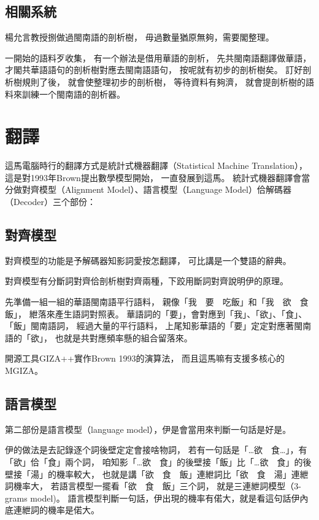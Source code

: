 \subsection{相關系統}
\label{小節：剖析相關系統}
楊允言教授捌做過閩南語的剖析樹\cite{台語文語法結構樹建置}，
毋過數量猶原無夠，需要閣整理。

一開始的語料歹收集，
有一个辦法是借用華語的剖析，
先共閩南語翻譯做華語，
才閣共華語語句的剖析樹\cite{chen2005chinese}對應去閩南語語句，
按呢就有初步的剖析樹矣。
訂好剖析樹規則了後，
就會使整理初步的剖析樹，
等待資料有夠濟，
就會提剖析樹的語料來訓練一个閩南語的剖析器\cite{klein2003accurate}。

\section{翻譯}
\label{節：翻譯}
這馬電腦時行的翻譯方式是統計式機器翻譯（Statistical Machine Translation），
這是對1993年Brown提出數學模型\cite{brown1993mathematics}開始，
一直發展到這馬。
統計式機器翻譯會當分做對齊模型（Alignment Model）、語言模型（Language Model）佮解碼器（Decoder）三个部份：

\subsection{對齊模型}
\label{小節：對齊模型}
對齊模型的功能是予解碼器知影詞愛按怎翻譯，
可比講是一个雙語的辭典。

對齊模型有分斷詞對齊佮剖析樹對齊兩種，下跤用斷詞對齊說明伊的原理。

先準備一組一組的華語閩南語平行語料，
親像「我　要　吃飯」和「我　欲　食　飯」，
紲落來產生語詞對照表。
華語詞的「要」，會對應到「我」、「欲」、「食」、「飯」閩南語詞，
經過大量的平行語料，
上尾知影華語的「要」定定對應著閩南語的「欲」，
也就是共對應頻率懸的組合留落來。

開源工具GIZA++\cite{och2003systematic}實作Brown 1993的演算法，
而且這馬嘛有支援多核心的MGIZA\cite{gao2008parallel}。

\subsection{語言模型}
\label{小節：語言模型}
第二部份是語言模型（language model），伊是會當用來判斷一句話是好是。

伊的做法是去記錄逐个詞後壁定定會接啥物詞，
若有一句話是「…欲　食…」，有「欲」佮「食」兩个詞，
咱知影「…欲　食」的後壁接「飯」比「…欲　食」的後壁接「湯」的機率較大，
也就是講「欲　食　飯」連紲詞比「欲　食　湯」連紲詞機率大，
若語言模型一擺看「欲　食　飯」三个詞，
就是三連紲詞模型（3-grams model)。
語言模型判斷一句話，伊出現的機率有偌大，就是看這句話伊內底連紲詞的機率是偌大。

